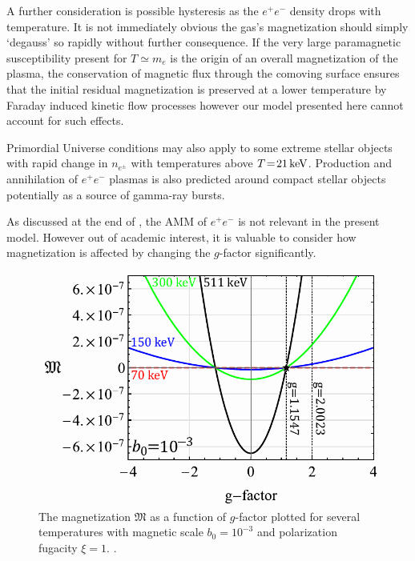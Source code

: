 A further consideration is possible hysteresis as the $e^{+}e^{-}$ density drops with temperature. It is not immediately obvious the gas's magnetization should simply `degauss' so rapidly without further consequence. If the very large paramagnetic susceptibility present for $T\simeq m_{e}$ is the origin of an overall magnetization of the plasma, the conservation of magnetic flux through the comoving surface ensures that the initial residual magnetization is preserved at a lower temperature by Faraday induced kinetic flow processes however our model presented here cannot account for such effects.

Primordial Universe conditions may also apply to some extreme stellar objects with rapid change in $n_{e^{\pm}}$ with temperatures above $T\!=\!21\text{\,keV}$. Production and annihilation of $e^{+}e^{-}$ plasmas is also predicted around compact stellar objects~\cite{Ruffini:2009hg,Ruffini:2012it} potentially as a source of gamma-ray bursts.

\noindent As discussed at the end of , the AMM of $e^{+}e^{-}$ is not relevant in the present model. However out of academic interest, it is valuable to consider how magnetization is affected by changing the $g$-factor significantly.

\begin{figure}
 \centering
 \hspace*{-0.8cm}\includegraphics[width=0.74\linewidth]{plots/thesis_gfac.pdf}
 \caption{The magnetization $\mathfrak M$ as a function of $g$-factor plotted for several temperatures with magnetic scale $b_{0}=10^{-3}$ and polarization fugacity $\xi=1$. . }
 \label{fig:gfac} 
\end{figure}

